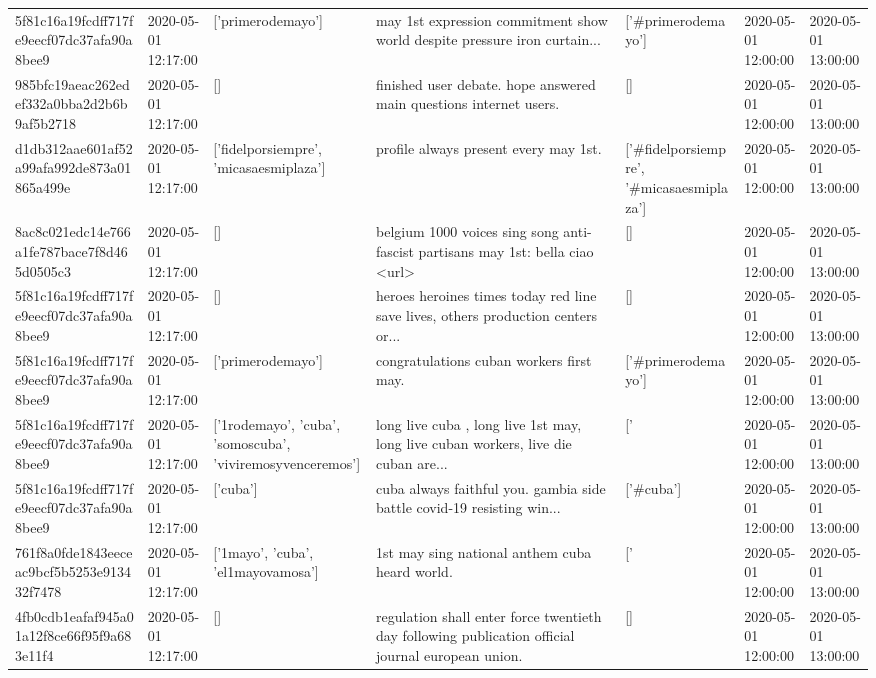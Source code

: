 \begin{tabular}{lllllll}
5f81c16a19fcdff717fe9eecf07dc37afa90a8bee9 & 2020-05-01 12:17:00 & ['primerodemayo'] & may 1st expression commitment show world despite pressure iron curtain... & ['#primerodemayo'] & 2020-05-01 12:00:00 & 2020-05-01 13:00:00 \\
985bfc19aeac262edef332a0bba2d2b6b9af5b2718 & 2020-05-01 12:17:00 & [] & finished user debate. hope answered main questions internet users. & [] & 2020-05-01 12:00:00 & 2020-05-01 13:00:00 \\
d1db312aae601af52a99afa992de873a01865a499e & 2020-05-01 12:17:00 & ['fidelporsiempre', 'micasaesmiplaza'] & profile always present every may 1st. & ['#fidelporsiempre', '#micasaesmiplaza'] & 2020-05-01 12:00:00 & 2020-05-01 13:00:00 \\
8ac8c021edc14e766a1fe787bace7f8d465d0505c3 & 2020-05-01 12:17:00 & [] & belgium 1000 voices sing song anti-fascist partisans may 1st: bella ciao <url> & [] & 2020-05-01 12:00:00 & 2020-05-01 13:00:00 \\
5f81c16a19fcdff717fe9eecf07dc37afa90a8bee9 & 2020-05-01 12:17:00 & [] & heroes heroines times today red line save lives, others production centers or... & [] & 2020-05-01 12:00:00 & 2020-05-01 13:00:00 \\
5f81c16a19fcdff717fe9eecf07dc37afa90a8bee9 & 2020-05-01 12:17:00 & ['primerodemayo'] & congratulations cuban workers first may. & ['#primerodemayo'] & 2020-05-01 12:00:00 & 2020-05-01 13:00:00 \\
5f81c16a19fcdff717fe9eecf07dc37afa90a8bee9 & 2020-05-01 12:17:00 & ['1rodemayo', 'cuba', 'somoscuba', 'viviremosyvenceremos'] & long live cuba , long live 1st may, long live cuban workers, live die cuban are... & ['#1rodemayo', '#cuba', '#somoscuba', '#viviremosyvenceremos'] & 2020-05-01 12:00:00 & 2020-05-01 13:00:00 \\
5f81c16a19fcdff717fe9eecf07dc37afa90a8bee9 & 2020-05-01 12:17:00 & ['cuba'] & cuba always faithful you. gambia side battle covid-19 resisting win... & ['#cuba'] & 2020-05-01 12:00:00 & 2020-05-01 13:00:00 \\
761f8a0fde1843eeceac9bcf5b5253e913432f7478 & 2020-05-01 12:17:00 & ['1mayo', 'cuba', 'el1mayovamosa'] & 1st may sing national anthem cuba heard world. & ['#1mayo', '#cuba', '#el1mayovamosa'] & 2020-05-01 12:00:00 & 2020-05-01 13:00:00 \\
4fb0cdb1eafaf945a01a12f8ce66f95f9a683e11f4 & 2020-05-01 12:17:00 & [] & regulation shall enter force twentieth day following publication official journal european union. & [] & 2020-05-01 12:00:00 & 2020-05-01 13:00:00 \\

\end{tabular}
